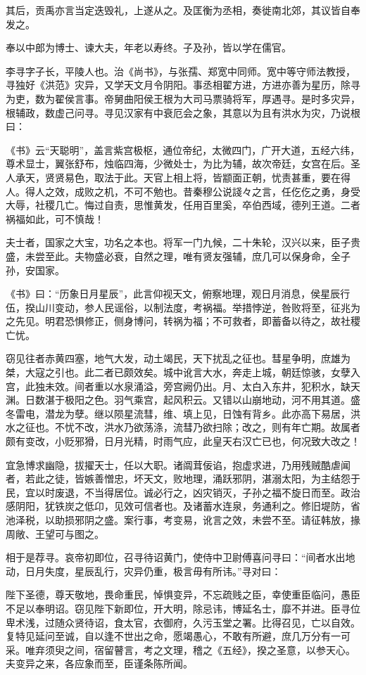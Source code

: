 \documentclass[]{article}
\begin{document}
其后，贡禹亦言当定迭毁礼，上遂从之。及匡衡为丞相，奏徙南北郊，其议皆自奉发之。

奉以中郎为博士、谏大夫，年老以寿终。子及孙，皆以学在儒官。

李寻字子长，平陵人也。治《尚书》，与张孺、郑宽中同师。宽中等守师法教授，寻独好《洪范》灾异，又学天文月令阴阳。事丞相翟方进，方进亦善为星历，除寻为吏，数为翟侯言事。帝舅曲阳侯王根为大司马票骑将军，厚遇寻。是时多灾异，根辅政，数虚己问寻。寻见汉家有中衰厄会之象，其意以为且有洪水为灾，乃说根曰：

《书》云``天聪明''，盖言紫宫极枢，通位帝纪，太微四门，广开大道，五经六纬，尊术显士，翼张舒布，烛临四海，少微处士，为比为辅，故次帝廷，女宫在后。圣人承天，贤贤易色，取法于此。天官上相上将，皆颛面正朝，忧责甚重，要在得人。得人之效，成败之机，不可不勉也。昔秦穆公说諓々之言，任仡仡之勇，身受大辱，社稷几亡。悔过自责，思惟黄发，任用百里奚，卒伯西域，德列王道。二者祸福如此，可不慎哉！

夫士者，国家之大宝，功名之本也。将军一门九候，二十朱轮，汉兴以来，臣子贵盛，未尝至此。夫物盛必衰，自然之理，唯有贤友强辅，庶几可以保身命，全子孙，安国家。

《书》曰：``历象日月星辰''，此言仰视天文，俯察地理，观日月消息，侯星辰行伍，揆山川变动，参人民谣俗，以制法度，考祸福。举措悖逆，咎败将至，征兆为之先见。明君恐惧修正，侧身博问，转祸为福；不可救者，即蓄备以待之，故社稷亡忧。

窃见往者赤黄四塞，地气大发，动土竭民，天下扰乱之征也。彗星争明，庶雄为桀，大寇之引也。此二者已颇效矣。城中讹言大水，奔走上城，朝廷惊骇，女孽入宫，此独未效。间者重以水泉涌溢，旁宫阙仍出。月、太白入东井，犯积水，缺天渊。日数湛于极阳之色。羽气乘宫，起风积云。又错以山崩地动，河不用其道。盛冬雷电，潜龙为孽。继以陨星流彗，维、填上见，日蚀有背乡。此亦高下易居，洪水之征也。不忧不改，洪水乃欲荡涤，流彗乃欲扫除；改之，则有年亡期。故属者颇有变改，小贬邪猾，日月光精，时雨气应，此皇天右汉亡已也，何况致大改之！

宜急博求幽隐，拔擢天士，任以大职。诸阘茸佞谄，抱虚求进，乃用残贼酷虐闻者，若此之徒，皆嫉善憎忠，坏天文，败地理，涌跃邪阴，湛溺太阳，为主结怨于民，宜以时废退，不当得居位。诚必行之，凶灾销灭，子孙之福不旋日而至。政治感阴阳，犹铁炭之低卬，见效可信者也。及诸蓄水连泉，务通利之。修旧堤防，省池泽税，以助损邪阴之盛。案行事，考变易，讹言之效，未尝不至。请征韩放，掾周敞、王望可与图之。

相于是荐寻。哀帝初即位，召寻待诏黄门，使侍中卫尉傅喜问寻曰：``间者水出地动，日月失度，星辰乱行，灾异仍重，极言毋有所讳。''寻对曰：

陛下圣德，尊天敬地，畏命重民，悼惧变异，不忘疏贱之臣，幸使重臣临问，愚臣不足以奉明诏。窃见陛下新即位，开大明，除忌讳，博延名士，靡不并进。臣寻位卑术浅，过随众贤待诏，食太官，衣御府，久污玉堂之署。比得召见，亡以自效。复特见延问至诚，自以逢不世出之命，愿竭愚心，不敢有所避，庶几万分有一可采。唯弃须臾之间，宿留瞽言，考之文理，稽之《五经》，揆之圣意，以参天心。夫变异之来，各应象而至，臣谨条陈所闻。
\end{document}

